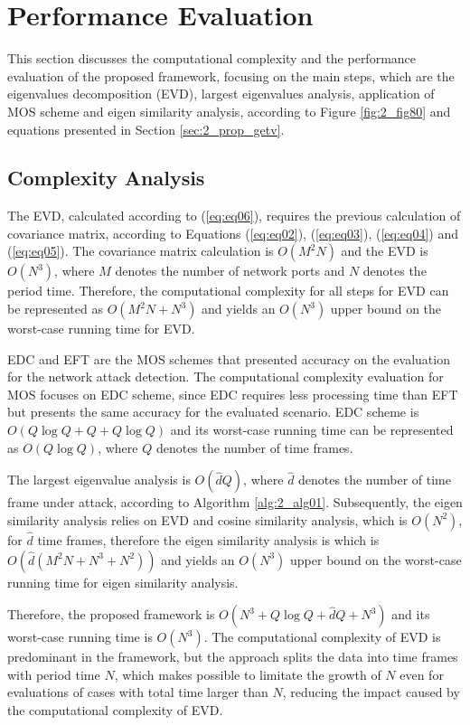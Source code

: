 \section{Performance Evaluation}
\label{sec:2_Complexity}

This section discusses the computational complexity and the performance evaluation of the proposed framework, focusing on the main steps, which are the eigenvalues decomposition (EVD), largest eigenvalues analysis, application of MOS scheme and eigen similarity analysis, according to Figure \ref{fig:2_fig80} and equations presented in Section \ref{sec:2_prop_getv}.

\subsection{Complexity Analysis}
\label{sec:2_ComplexityAnalysis}
The EVD, calculated according to (\ref{eq:eq06}), requires the previous calculation of covariance matrix, according to Equations (\ref{eq:eq02}), (\ref{eq:eq03}), (\ref{eq:eq04}) and (\ref{eq:eq05}). The covariance matrix calculation is $O(M^2N)$ and the EVD is $O(N^3)$, where $M$ denotes the number of network ports and $N$ denotes the period time. Therefore, the computational complexity for all steps for EVD can be represented as $O(M^2N + N^3)$ and yields an $O(N^3)$ upper bound on the worst-case running time for EVD.

EDC and EFT are the MOS schemes that presented accuracy on the evaluation for the network attack detection. The computational complexity evaluation for MOS focuses on EDC scheme, since EDC requires less processing time than EFT but presents the same accuracy for the evaluated scenario. EDC scheme is $O(Q \log Q + Q + Q \log Q)$ and its worst-case running time can be represented as $O(Q \log Q)$, where $Q$ denotes the number of time frames.

The largest eigenvalue analysis is $O(\hat{d}Q)$, where $\hat{d}$ denotes the number of time frame under attack, according to Algorithm \ref{alg:2_alg01}. Subsequently, the eigen similarity analysis relies on EVD and cosine similarity analysis, which is $O(N^2)$, for $\hat{d}$ time frames, therefore the eigen similarity analysis is which is $O(\hat{d}(M^2N + N^3 + N^2))$ and yields an $O(N^3)$ upper bound on the worst-case running time for eigen similarity analysis.

Therefore, the proposed framework is $O(N^3 + Q \log Q + \hat{d}Q + N^3)$ and its worst-case running time is $O(N^3)$. The computational complexity of EVD is predominant in the framework, but the approach splits the data into time frames with period time $N$, which makes possible to limitate the growth of $N$ even for evaluations of cases with total time larger than $N$, reducing the impact caused by the computational complexity of EVD. 

